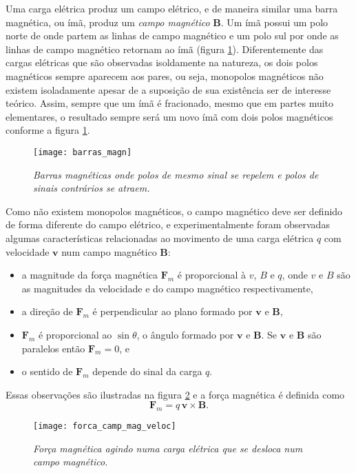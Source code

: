 Uma carga elétrica produz um campo elétrico, e de maneira similar uma barra magnética, ou ímã, produz um \textit{campo magnético} $\textbf{B}$. Um ímã possui um polo norte de onde partem as linhas de campo magnético e um polo sul por onde as linhas de campo magnético retornam ao ímã (figura \ref{fig.barras_mag}). Diferentemente das cargas elétricas que são observadas isoldamente na natureza, os dois polos magnéticos sempre aparecem aos pares, ou seja, monopolos magnéticos não existem isoladamente apesar de a suposição de sua existência ser de interesse teórico. Assim, sempre que um ímã é fracionado, mesmo que em partes muito elementares, o resultado sempre será um novo ímã com dois polos magnéticos conforme a figura \ref{fig.barras_mag}.
\begin{figure}[!htb]
\centering
\texttt{[image: barras\_magn]}
\caption{\textit{Barras magnéticas onde polos de mesmo sinal se repelem e polos de sinais contrários se atraem.}}
\label{fig.barras_mag}
\end{figure}
Como não existem monopolos magnéticos, o campo magnético deve ser definido de forma diferente do campo elétrico, e experimentalmente foram observadas algumas características relacionadas ao movimento de uma carga elétrica $q$ com velocidade $\textbf{v}$ num campo magnético $\textbf{B}$:
\begin{itemize}
\item a magnitude da força magnética $\textbf{F}_m$ é proporcional à $v$, $B$ e $q$, onde $v$ e $B$ são as magnitudes da velocidade e do campo magnético respectivamente,
\item a direção de $\textbf{F}_m$ é perpendicular ao plano formado por $\textbf{v}$ e $\textbf{B}$,
\item $\textbf{F}_m$ é proporcional ao $\sin\theta$, o ângulo formado por $\textbf{v}$ e $\textbf{B}$. Se $\textbf{v}$ e $\textbf{B}$ são paralelos então $\textbf{F}_m=0$, e
\item o sentido de $\textbf{F}_m$ depende do sinal da carga $q$.
\end{itemize}
Essas observações são ilustradas na figura \ref{fig.froca_mag_veloc} e a força magnética é definida como
\begin{equation}\label{eq.forca_mag}
\textbf{F}_m=q\,\textbf{v}\times\textbf{B}.
\end{equation}
\begin{figure}[!htb]
\centering
\texttt{[image: forca\_camp\_mag\_veloc]}
\caption{\textit{Força magnética agindo numa carga elétrica que se desloca num campo magnético.}}
\label{fig.froca_mag_veloc}
\end{figure}
